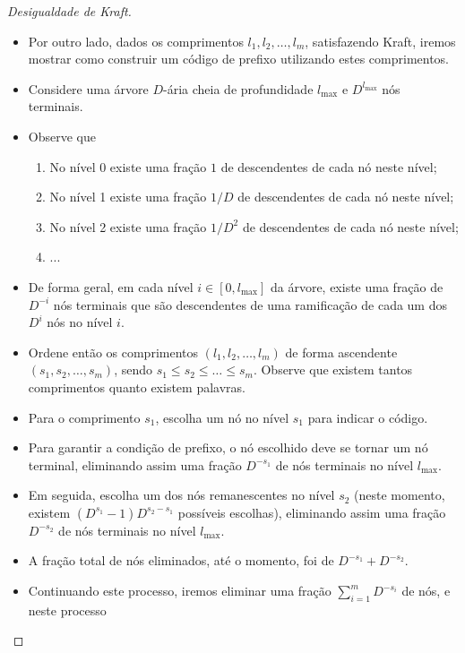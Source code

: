 \begin{frame}[allowframebreaks]
\begin{proof}[Desigualdade de Kraft]
\begin{itemize}
  \item Por outro lado, dados os comprimentos $l_1, l_2, \ldots, l_m$, satisfazendo Kraft, iremos mostrar como
	construir um código de prefixo utilizando estes comprimentos.
  \item Considere uma árvore $D$-ária cheia de profundidade $l_{\text{max}}$ e $D^{l_{\text{max}}}$ nós terminais.
  \end{itemize}
  \proofbreak
  \begin{itemize}
  \item Observe que
	\begin{enumerate}
	\item No nível 0 existe uma fração $1$ de descendentes de cada nó neste nível;
	\item No nível 1 existe uma fração $1/D$ de descendentes de cada nó neste nível;
	\item No nível 2 existe uma fração $1/D^2$ de descendentes de cada nó neste nível;
	\item ...
	\end{enumerate}
  \item De forma geral, em cada nível $i \in [0, l_{\text{max}}]$ da árvore, existe uma fração de $D^{-i}$
	nós terminais que são descendentes de uma ramificação de cada um dos $D^i$ nós no nível $i$.
  \end{itemize}
  \proofbreak
  \begin{itemize}
  \item Ordene então os comprimentos $(l_1, l_2, \ldots, l_m)$ de forma ascendente $(s_1, s_2, \ldots, s_m)$, 
	sendo $s_1 \leq s_2 \leq \ldots \leq s_m$. Observe que existem tantos comprimentos quanto existem palavras.
  \item Para o comprimento $s_1$, escolha um nó no nível $s_1$ para indicar o código.
  \item Para garantir a condição de prefixo, o nó escolhido deve se tornar um nó terminal, eliminando assim uma
	fração $D^{-s_1}$ de nós terminais no nível $l_{\text{max}}$.
  \item Em seguida, escolha um dos nós remanescentes no nível $s_2$ (neste momento, existem $(D^{s_1}-1)D^{s_2-s_1}$
	possíveis escolhas), eliminando assim uma fração $D^{-s_2}$ de nós terminais no nível $l_{\text{max}}$.
  \end{itemize}
  \proofbreak
  \begin{itemize}
  \item A fração total de nós eliminados, até o momento, foi de $D^{-s_1} + D^{-s_2}$.
  \item Continuando este processo, iremos eliminar uma fração $\sum_{i=1}^{m} D^{-s_i}$ de nós, e neste processo

\end{itemize}
\end{proof}
\end{frame}
